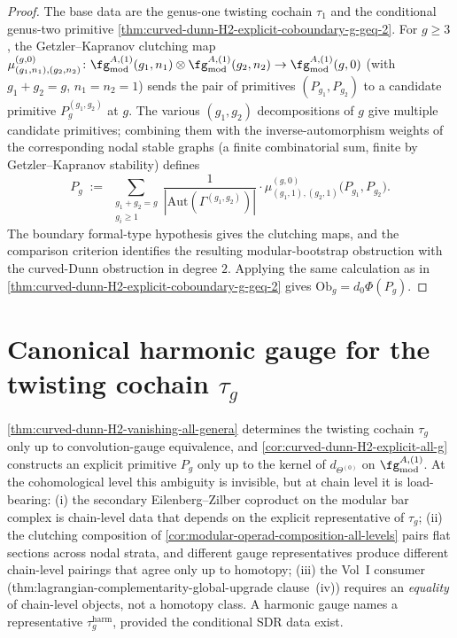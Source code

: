 \begin{proof}
The base data are the genus-one twisting cochain \(\tau_{1}\) and
the conditional genus-two primitive
\autoref{thm:curved-dunn-H2-explicit-coboundary-g-geq-2}. For
\(g \ge 3\), the Getzler--Kapranov clutching map
\(\mu_{(g_{1}, n_{1}), (g_{2}, n_{2})}^{(g, 0)}\colon
\fg^{A,(1)}_{\mathrm{mod}}(g_{1}, n_{1}) \otimes
\fg^{A,(1)}_{\mathrm{mod}}(g_{2}, n_{2}) \to
\fg^{A,(1)}_{\mathrm{mod}}(g, 0)\) (with
\(g_{1} + g_{2} = g\), \(n_{1} = n_{2} = 1\)) sends the pair of
primitives \((P_{g_{1}}, P_{g_{2}})\) to a candidate primitive
\(P_{g}^{(g_{1}, g_{2})}\) at \(g\). The various
\((g_{1}, g_{2})\) decompositions of \(g\) give multiple candidate
primitives; combining them with the inverse-automorphism weights of
the corresponding nodal stable graphs (a finite combinatorial
sum, finite by Getzler--Kapranov stability) defines
\[
 P_{g}
 \;:=\;
 \sum_{\substack{g_{1} + g_{2} = g\\g_{i} \ge 1}}
 \frac{1}{|\mathrm{Aut}(\Gamma^{(g_{1}, g_{2})})|}
 \cdot
 \mu_{(g_{1}, 1), (g_{2}, 1)}^{(g, 0)}
 \bigl(P_{g_{1}}, P_{g_{2}}\bigr).
\]
The boundary formal-type hypothesis gives the clutching maps, and
the comparison criterion identifies the resulting
modular-bootstrap obstruction with the curved-Dunn obstruction in
degree \(2\). Applying the same calculation as in
\autoref{thm:curved-dunn-H2-explicit-coboundary-g-geq-2} gives
\(\mathrm{Ob}_{g}=d_{0}\Phi(P_{g})\).
\end{proof}

\section{Canonical harmonic gauge for the twisting cochain
\texorpdfstring{$\tau_{g}$}{tau\_g}}
\label{sec:harmonic-gauge}

\autoref{thm:curved-dunn-H2-vanishing-all-genera} determines the
twisting cochain \(\tau_{g}\) only up to convolution-gauge
equivalence, and
\autoref{cor:curved-dunn-H2-explicit-all-g} constructs an
explicit primitive \(P_{g}\) only up to the kernel of
\(d_{\Theta^{(0)}}\) on \(\fg^{A,(1)}_{\mathrm{mod}}\). At the
cohomological level this ambiguity is invisible, but at chain level
it is load-bearing: (i) the secondary Eilenberg--Zilber coproduct
on the modular bar complex is chain-level data that depends on the
explicit representative of \(\tau_{g}\); (ii) the clutching
composition of \autoref{cor:modular-operad-composition-all-levels}
pairs flat sections across nodal strata, and different gauge
representatives produce different chain-level pairings that agree
only up to homotopy; (iii) the Vol~I consumer
(\textup{thm:lagrangian-complementarity-global-upgrade} clause~(iv))
requires an \emph{equality} of chain-level objects, not a homotopy
class. A harmonic gauge names a representative
\(\tau_{g}^{\mathrm{harm}}\), provided the conditional SDR data
exist.

